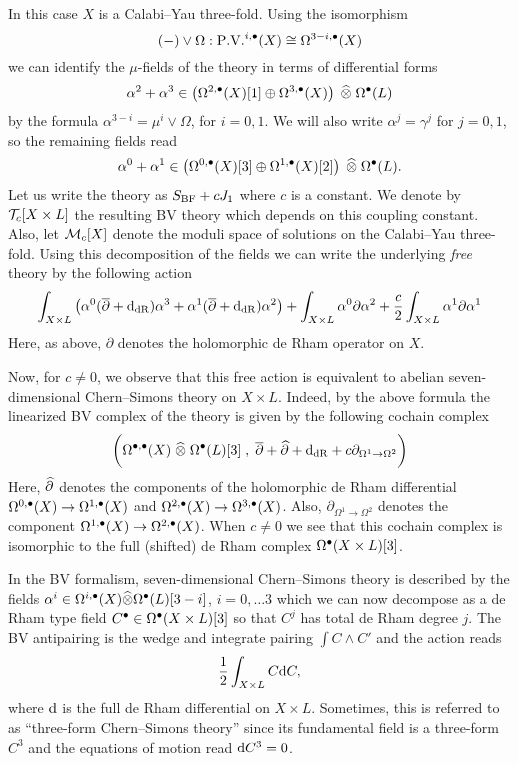 \documentclass[11pt]{amsart}
\begin{document}
In this case $X$ is a Calabi--Yau three-fold.
Using the isomorphism
\[
 (-) \vee \Omega : \PV^{i,\bu} (X) \cong \Omega^{3-i, \bu}(X)
\]
we can identify the $\mu$-fields of the theory in terms of differential forms
\[
  \alpha^2 + \alpha^3 \in \left(\Omega^{2,\bu}(X)[1] \oplus \Omega^{3,\bu}(X)\right) \; \Hat{\otimes} \; \Omega^\bu(L)
\]
by the formula $\alpha^{3-i} = \mu^{i} \vee \Omega$, for $i=0,1$.
We will also write $\alpha^{j} = \gamma^{j}$ for $j=0,1$, so the remaining fields read
\[
  \alpha^0 + \alpha^1 \in \left(\Omega^{0,\bu}(X)[3] \oplus \Omega^{1,\bu}(X)[2] \right) \; \Hat{\otimes} \; \Omega^\bu (L).
\]
Let us write the theory as $S_{\rm BF} + c J_1$ where $c$ is a constant.
We denote by $\cT_c [X \times L]$ the resulting BV theory which depends on this coupling constant.
Also, let $\cM_c[X]$ denote the moduli space of solutions on the Calabi--Yau three-fold.
Using this decomposition of the fields we can write the underlying {\em free} theory by the following action
\[
  \int_{X\times L} \left(\alpha^0 (\dbar + \d_{\rm dR}) \alpha^3 + \alpha^1 (\dbar + \d_{\rm dR}) \alpha^2 \right) + \int_{X \times L} \alpha^0 \partial \alpha^2 + \frac{c}{2} \int_{X \times L} \alpha^1 \partial \alpha^1
\]
Here, as above, $\partial$ denotes the holomorphic de Rham operator on $X$.

Now, for $c \ne 0$, we observe that this free action is equivalent to abelian seven-dimensional Chern--Simons theory on $X \times L$.
Indeed, by the above formula the linearized BV complex of the theory is given by the following cochain complex
\[
  \bigg(\Omega^{\bu, \bu} (X) \; \Hat{\otimes} \; \Omega^{\bu}(L) [3] \; , \; \dbar + \Hat{\partial} + \d_{\rm dR} + c \partial_{\Omega^{1} \to \Omega^{2}} \bigg)
\]
Here, $\Hat{\partial}$ denotes the components of the holomorphic de Rham differential $\Omega^{0,\bu}(X) \to \Omega^{1,\bu}(X)$ and $\Omega^{2,\bu}(X) \to \Omega^{3,\bu}(X)$.
Also, $\partial_{\Omega^1 \to \Omega^2}$ denotes the component $\Omega^{1,\bu}(X) \to \Omega^{2,\bu}(X)$.
When $c \ne 0$ we see that this cochain complex is isomorphic to the full (shifted) de Rham complex $\Omega^\bu(X \times L)[3]$.

In the BV formalism, seven-dimensional Chern--Simons theory is described by the fields $\alpha^i \in \Omega^{i,\bu}(X) \Hat{\otimes} \Omega^\bu(L)[3-i]$, $i=0, \ldots 3$ which we can now decompose as a de Rham type field $C^\bu \in \Omega^\bu(X \times L)[3]$ so that $C^j$ has total de Rham degree $j$.
The BV antipairing is the wedge and integrate pairing $\int C \wedge C'$ and the action reads
\[
  \frac{1}{2} \int_{X \times L} C \d C,
\]
where $\d$ is the full de Rham differential on $X \times L$.
Sometimes, this is referred to as ``three-form Chern--Simons theory'' since its fundamental field is a three-form $C^3$ and the equations of motion read $\d C^3 = 0$.
\end{document}
